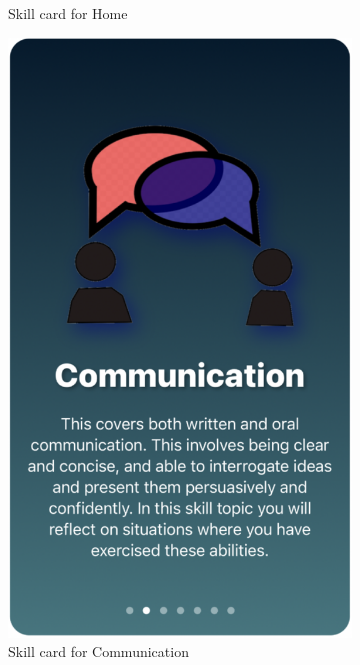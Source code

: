 \documentclass{l4proj}
\begin{document}
\begin{appendices}
\begin{figure}[H]
\begin{subfigure}[b]{0.3\textwidth}
        \caption{Skill card for Home}
        \label{fig:HomeCard}
    \end{subfigure}
    \begin{subfigure}[b]{0.3\textwidth}
        \includegraphics[scale=0.2]{images/CommunicationCard.pdf}
        \caption{Skill card for Communication}
        \label{fig:CommunicationCard}
    \end{subfigure}  
    \begin{subfigure}[b]{0.3\textwidth}

\end{subfigure}
\end{figure}
\end{appendices}
\end{document}
